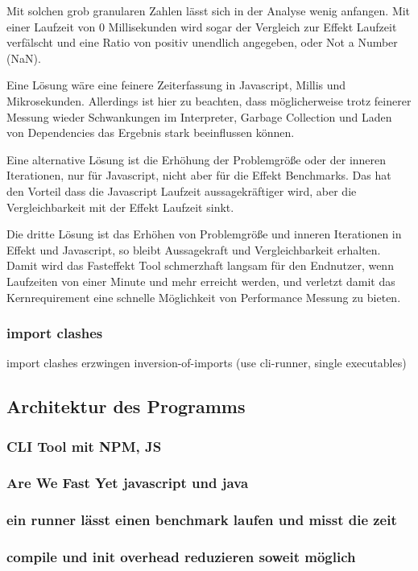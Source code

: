 Mit solchen grob granularen Zahlen lässt sich in der Analyse wenig anfangen. Mit einer Laufzeit von 0 Millisekunden wird sogar der Vergleich zur Effekt Laufzeit verfälscht und eine Ratio von positiv unendlich angegeben, oder Not a Number (NaN).

Eine Lösung wäre eine feinere Zeiterfassung in Javascript, Millis und Mikrosekunden. Allerdings ist hier zu beachten, dass möglicherweise trotz feinerer Messung wieder Schwankungen im Interpreter, Garbage Collection und Laden von Dependencies das Ergebnis stark beeinflussen können.

Eine alternative Lösung ist die Erhöhung der Problemgröße oder der inneren Iterationen, nur für Javascript, nicht aber für die Effekt Benchmarks.
Das hat den Vorteil dass die Javascript Laufzeit aussagekräftiger wird, aber die Vergleichbarkeit mit der Effekt Laufzeit sinkt.

Die dritte Lösung ist das Erhöhen von Problemgröße und inneren Iterationen in Effekt und Javascript, so bleibt Aussagekraft und Vergleichbarkeit erhalten.
Damit wird das Fasteffekt Tool schmerzhaft langsam für den Endnutzer, wenn Laufzeiten von einer Minute und mehr erreicht werden, und verletzt damit das Kernrequirement eine schnelle Möglichkeit von Performance Messung zu bieten.

\subsubsection{ import clashes }
import clashes erzwingen inversion-of-imports (use cli-runner, single executables)

\subsection{Architektur des Programms}
\subsubsection{ CLI Tool mit NPM, JS }
\subsubsection{ Are We Fast Yet javascript und java }
\subsubsection{ ein runner lässt einen benchmark laufen und misst die zeit }
\subsubsection{ compile und init overhead reduzieren soweit möglich }
  
